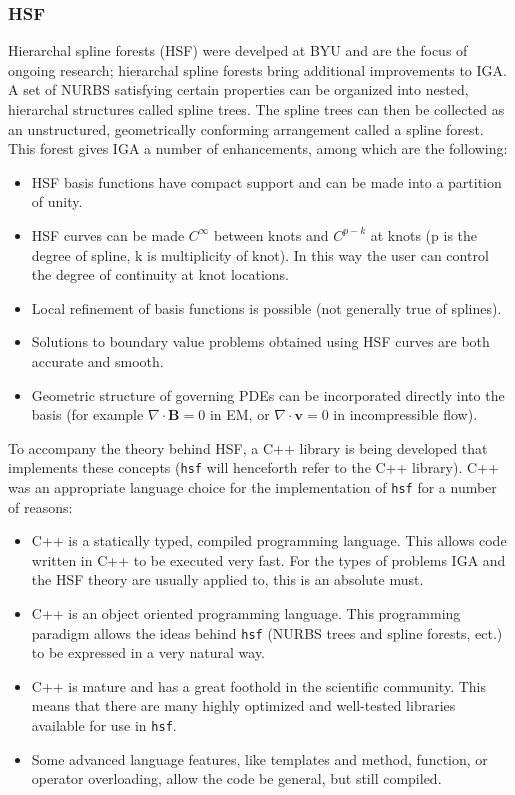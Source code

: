       \subsubsection{HSF} \label{ssub:hsfpy}

        Hierarchal spline forests (HSF) were develped at BYU and are the focus of ongoing research; hierarchal spline forests bring additional improvements to IGA. A set of NURBS satisfying certain properties can be organized into nested, hierarchal structures called spline trees.  The spline trees can then be collected as an unstructured, geometrically conforming arrangement called a spline forest. This forest gives IGA a number of enhancements, among which are the following:

    \begin{itemize}
      \item HSF basis functions have compact support and can be made into a partition of unity.
      \item HSF curves can be made $C^{\infty}$ between knots and $C^{p-k}$ at knots (p is the degree of spline, k is multiplicity of knot). In this way the user can control the degree of continuity at knot locations.
      \item Local refinement of basis functions is possible (not generally true of splines).
      \item Solutions to boundary value problems obtained using HSF curves are both accurate and smooth.
      \item Geometric structure of governing PDEs can be incorporated directly into the basis (for example $\nabla\cdot\mathbf{B} = 0$ in EM, or $\nabla\cdot\mathbf{v} = 0$ in incompressible flow).
    \end{itemize}
    \mainstretch{}

    To accompany the theory behind HSF, a C++ library is being developed that implements these concepts (\texttt{hsf} will henceforth refer to the C++ library). C++ was an appropriate language choice for the implementation of \texttt{hsf} for a number of reasons:

    \begin{itemize}
      \item C++ is a statically typed, compiled programming language. This allows code written in C++ to be executed very fast. For the types of problems IGA and the HSF theory are usually applied to, this is an absolute must.
      \item C++ is an object oriented programming language. This programming paradigm allows the ideas behind \texttt{hsf} (NURBS trees and spline forests, ect.) to be expressed in a very natural way.
      \item C++ is mature and has a great foothold in the scientific community. This means that there are many highly optimized and well-tested libraries available for use in \texttt{hsf}.
      \item Some advanced language features, like templates and method, function, or operator overloading, allow the code be general, but still compiled.
    \end{itemize}
    \mainstretch{}

